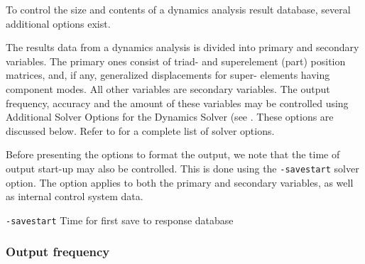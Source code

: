 


To control the size and contents of a dynamics analysis result database,
several additional options exist.

The results data from a dynamics analysis is divided into primary and
secondary variables. The primary ones consist of triad- and superelement
(part) position matrices, and, if any, generalized displacements for
super- elements having component modes. All other variables are
secondary variables. The output frequency, accuracy and the amount of
these variables may be controlled using Additional Solver Options for
the Dynamics Solver
(see .
These options are discussed below.
Refer to 
for a complete list of solver options.


Before presenting the options to format the output, we note that the
time of output start-up may also be controlled. This is done using the
{\tt-savestart} solver option. The option applies to both the
primary and secondary variables, as well as internal control system data.

{\tt-savestart} \hskip1cm Time for first save to response database


\subsubsection{Output frequency}

